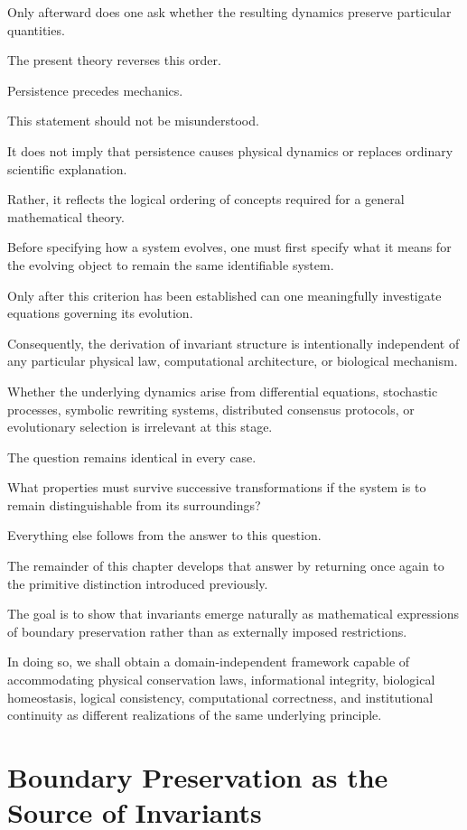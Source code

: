 \documentclass[11pt]{book}
\numberwithin{equation}{chapter}
\theoremstyle{definition}
\theoremstyle{plain}
\begin{document}
Only afterward does one ask whether the resulting dynamics preserve particular quantities.

The present theory reverses this order.

Persistence precedes mechanics.

This statement should not be misunderstood.

It does not imply that persistence causes physical dynamics or replaces ordinary scientific explanation.

Rather, it reflects the logical ordering of concepts required for a general mathematical theory.

Before specifying how a system evolves, one must first specify what it means for the evolving object to remain the same identifiable system.

Only after this criterion has been established can one meaningfully investigate equations governing its evolution.

Consequently, the derivation of invariant structure is intentionally independent of any particular physical law, computational architecture, or biological mechanism.

Whether the underlying dynamics arise from differential equations, stochastic processes, symbolic rewriting systems, distributed consensus protocols, or evolutionary selection is irrelevant at this stage.

The question remains identical in every case.

What properties must survive successive transformations if the system is to remain distinguishable from its surroundings?

Everything else follows from the answer to this question.

The remainder of this chapter develops that answer by returning once again to the primitive distinction introduced previously.

The goal is to show that invariants emerge naturally as mathematical expressions of boundary preservation rather than as externally imposed restrictions.

In doing so, we shall obtain a domain-independent framework capable of accommodating physical conservation laws, informational integrity, biological homeostasis, logical consistency, computational correctness, and institutional continuity as different realizations of the same underlying principle.

\section{Boundary Preservation as the Source of Invariants}
\end{document}
